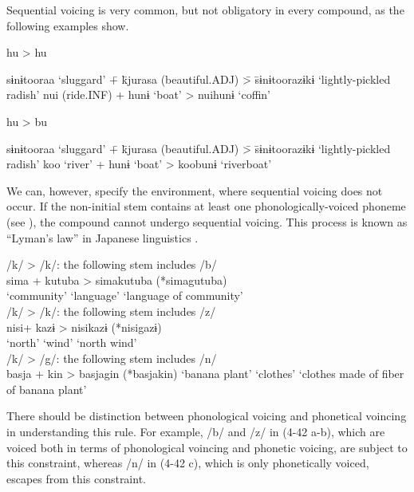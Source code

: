 Sequential voicing is very common, but not obligatory in every compound, as the following examples show.

\ea  \exi{}  hu > hu \label{ex:4.41}
    \begin{tabbing} sɨnɨtooraa ‘sluggard’ \= + \= kjurasa (beautiful.ADJ) \= > \= sɨnɨtoorazɨkɨ ‘lightly-pickled radish’\kill
    nui  (ride.INF) \> + \> hunɨ  ‘boat’ \> > \> nuihunɨ  ‘coffin’
    \end{tabbing}
     hu > bu
    \begin{tabbing} sɨnɨtooraa ‘sluggard’ \= + \= kjurasa (beautiful.ADJ) \= > \= sɨnɨtoorazɨkɨ ‘lightly-pickled radish’\kill
    koo  ‘river’  \> + \>  hunɨ  ‘boat’ \> > \> koobunɨ  ‘riverboat’
    \end{tabbing}
\z 

We can, however, specify the environment, where sequential voicing does not occur. If the non-initial stem contains at least one phonologically-voiced phoneme (see ), the compound cannot undergo sequential voicing. This process is known as “Lyman’s law” in Japanese linguistics \citep{Lyman1894}.

\ea \label{ex:4.42}
\ea /k/ > /k/: the following stem includes /b/ \label{ex:4.42a}\\
    \gll     sima   +  kutuba    >  {simakutuba  (*simagutuba)} \\
           ‘community’ {} ‘language’ {} ‘language of community’\\
\ex /k/ > /k/: the following stem includes /z/\\
    \gll  nisi\footnotemark   +  kazɨ    >  {nisikazɨ  (*nisigazɨ)}\\
      ‘north’     {}          ‘wind’   {}    {‘north wind’}\\
\ex  /k/ > /g/: the following stem includes /n/\\
    basja    +  kin    >  {basjagin  (*basjakin)}
     {‘banana plant’}   {} ‘clothes’  {}       {‘clothes made of fiber of banana plant’}
    \z
\z
{}

There should be distinction between phonological voicing and phonetical voincing in understanding this rule. For example, /b/ and /z/ in (4-42 a-b), which are voiced both in terms of phonological voincing and phonetic voicing, are subject to this constraint, whereas /n/ in (4-42 c), which is only phonetically voiced, escapes from this constraint.

